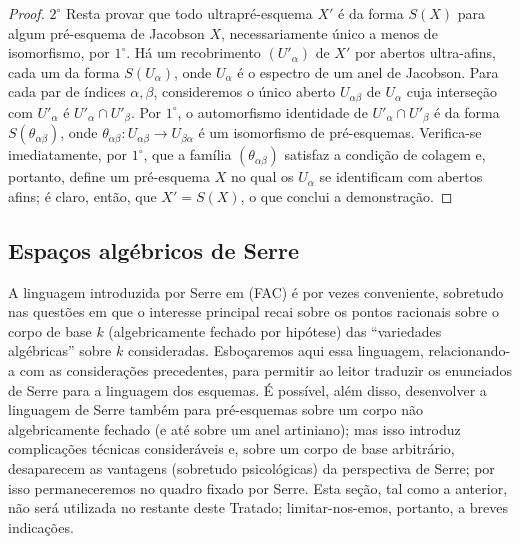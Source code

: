\begin{proof}
$2^\circ$ Resta provar que todo ultrapré-esquema $X'$ é da forma $S(X)$ para algum pré-esquema de Jacobson $X$, necessariamente único a menos de isomorfismo, por $1^\circ$.
Há um recobrimento $(U'_\alpha)$ de $X'$ por abertos ultra-afins, cada um da forma $S(U_\alpha)$, onde $U_\alpha$ é o espectro de um anel de Jacobson.
Para cada par de índices $\alpha,\beta$, consideremos o único aberto $U_{\alpha\beta}$ de $U_\alpha$ cuja interseção com $U'_\alpha$ é $U'_\alpha\cap U'_\beta$.
Por $1^\circ$, o automorfismo identidade de $U'_\alpha\cap U'_\beta$ é da forma $S(\theta_{\alpha\beta})$, onde $\theta_{\alpha\beta}:U_{\alpha\beta}\to U_{\beta\alpha}$ é um isomorfismo de pré-esquemas.
Verifica-se imediatamente, por $1^\circ$, que a família $(\theta_{\alpha\beta})$ satisfaz a condição de colagem  e, portanto, define um pré-esquema $X$ no qual os $U_\alpha$ se identificam com abertos afins; é claro, então, que $X'=S(X)$, o que conclui a demonstração.
\end{proof}

\subsection{Espaços algébricos de Serre}
\label{subsection:IV.10.10}

\begin{env}[10.10.1]
\label{IV.10.10.1}
A linguagem introduzida por Serre em (FAC) é por vezes conveniente, sobretudo nas questões em que o interesse principal recai sobre os pontos racionais sobre o corpo de base $k$ (algebricamente fechado por hipótese) das ``variedades algébricas'' sobre $k$ consideradas.
Esboçaremos aqui essa linguagem, relacionando-a com as considerações precedentes, para permitir ao leitor traduzir os enunciados de Serre para a linguagem dos esquemas.
É possível, além disso, desenvolver a linguagem de Serre também para pré-esquemas sobre um corpo não algebricamente fechado (e até sobre um anel artiniano); mas isso introduz complicações técnicas consideráveis e, sobre um corpo de base arbitrário, desaparecem as vantagens (sobretudo psicológicas) da perspectiva de Serre; por isso
permaneceremos no quadro fixado por Serre.
Esta seção, tal como a anterior, não será utilizada no restante deste Tratado; limitar-nos-emos, portanto, a breves indicações.
\end{env}

